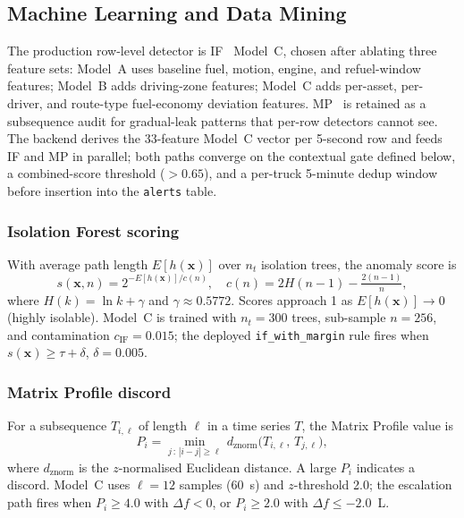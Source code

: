 \documentclass[10pt,journal]{IEEEtran}
\begin{document}
\subsection{Machine Learning and Data Mining}
The production row-level detector is IF~\cite{liu2008isolation_forest} Model~C, chosen after ablating three feature sets: Model~A uses baseline fuel, motion, engine, and refuel-window features; Model~B adds driving-zone features; Model~C adds per-asset, per-driver, and route-type fuel-economy deviation features. MP~\cite{yeh2016matrix_profile} is retained as a subsequence audit for gradual-leak patterns that per-row detectors cannot see. The backend derives the 33-feature Model~C vector per 5-second row and feeds IF and MP in parallel; both paths converge on the contextual gate defined below, a combined-score threshold ($>0.65$), and a per-truck 5-minute dedup window before insertion into the \texttt{alerts} table.

\subsubsection{Isolation Forest scoring}
With average path length $E[h(\mathbf{x})]$ over $n_t$ isolation trees, the anomaly score is
\begin{equation}
s(\mathbf{x}, n) = 2^{-E[h(\mathbf{x})]/c(n)},\quad c(n) = 2H(n-1) - \tfrac{2(n-1)}{n},
\label{eq:art-if-score}
\end{equation}
where $H(k) = \ln k + \gamma$ and $\gamma \approx 0.5772$. Scores approach 1 as $E[h(\mathbf{x})]\to 0$ (highly isolable). Model~C is trained with $n_t = 300$ trees, sub-sample $n = 256$, and contamination $c_{\mathrm{IF}} = 0.015$; the deployed \texttt{if\_with\_margin} rule fires when $s(\mathbf{x}) \geq \tau + \delta$, $\delta = 0.005$.

\subsubsection{Matrix Profile discord}
For a subsequence $T_{i,\ell}$ of length $\ell$ in a time series $T$, the Matrix Profile value is
\begin{equation}
P_i = \min_{j\,:\,|i-j|\geq\ell}\, d_{\mathrm{znorm}}\bigl(T_{i,\ell},\, T_{j,\ell}\bigr),
\label{eq:art-mp-score}
\end{equation}
where $d_{\mathrm{znorm}}$ is the $z$-normalised Euclidean distance. A large $P_i$ indicates a discord. Model~C uses $\ell = 12$ samples (60~s) and $z$-threshold 2.0; the escalation path fires when $P_i \geq 4.0$ with $\Delta f < 0$, or $P_i \geq 2.0$ with $\Delta f \leq -2.0$~L.
\end{document}
